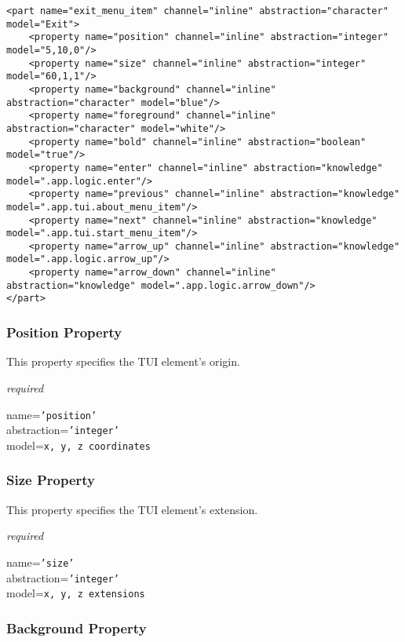 \begin{scriptsize}
    \begin{verbatim}
<part name="exit_menu_item" channel="inline" abstraction="character" model="Exit">
    <property name="position" channel="inline" abstraction="integer" model="5,10,0"/>
    <property name="size" channel="inline" abstraction="integer" model="60,1,1"/>
    <property name="background" channel="inline" abstraction="character" model="blue"/>
    <property name="foreground" channel="inline" abstraction="character" model="white"/>
    <property name="bold" channel="inline" abstraction="boolean" model="true"/>
    <property name="enter" channel="inline" abstraction="knowledge" model=".app.logic.enter"/>
    <property name="previous" channel="inline" abstraction="knowledge" model=".app.tui.about_menu_item"/>
    <property name="next" channel="inline" abstraction="knowledge" model=".app.tui.start_menu_item"/>
    <property name="arrow_up" channel="inline" abstraction="knowledge" model=".app.logic.arrow_up"/>
    <property name="arrow_down" channel="inline" abstraction="knowledge" model=".app.logic.arrow_down"/>
</part>
    \end{verbatim}
\end{scriptsize}

\subsubsection{Position Property}

This property specifies the TUI element's origin.

\emph{required}

name=\texttt{'position'}\\
abstraction=\texttt{'integer'}\\
model=\texttt{x, y, z coordinates}

\subsubsection{Size Property}

This property specifies the TUI element's extension.

\emph{required}

name=\texttt{'size'}\\
abstraction=\texttt{'integer'}\\
model=\texttt{x, y, z extensions}

\subsubsection{Background Property}

